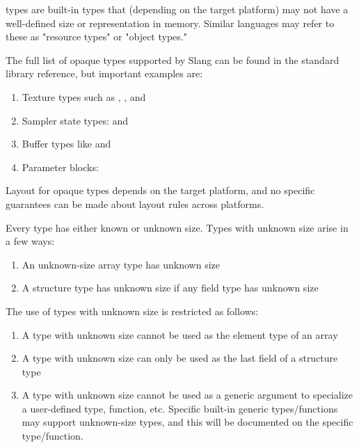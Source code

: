 
 types are built-in types that (depending on the target platform) may not have a well-defined size or representation in memory.
Similar languages may refer to these as "resource types" or "object types."

The full list of opaque types supported by Slang can be found in the standard library reference, but important examples are:

\begin{enumerate}
  \item{Texture types such as , , and }
  \item{Sampler state types:  and }
  \item{Buffer types like  and  }
  \item{Parameter blocks: }
\end{enumerate}

Layout for opaque types depends on the target platform, and no specific guarantees can be made about layout rules across platforms.


Every type has either known or unknown size.
Types with unknown size arise in a few ways:

\begin{enumerate}
  \item{An unknown-size array type has unknown size}
  \item{A structure type has unknown size if any field type has unknown size}
\end{enumerate}

The use of types with unknown size is restricted as follows:
\begin{enumerate}
  \item{A type with unknown size cannot be used as the element type of an array}
  \item{A type with unknown size can only be used as the last field of a structure type}
  \item{A type with unknown size cannot be used as a generic argument to specialize a user-defined type, function, etc. Specific built-in generic types/functions may support unknown-size types, and this will be documented on the specific type/function.}
\end{enumerate}
